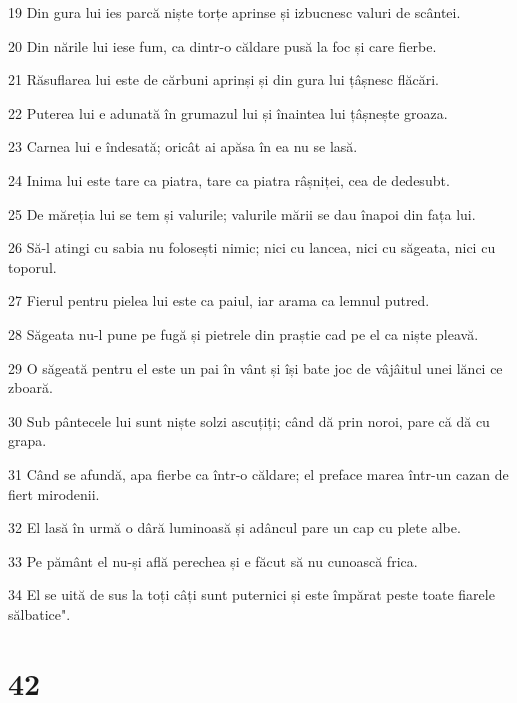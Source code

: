 \par 19 Din gura lui ies parcă niște torțe aprinse și izbucnesc valuri de scântei.
\par 20 Din nările lui iese fum, ca dintr-o căldare pusă la foc și care fierbe.
\par 21 Răsuflarea lui este de cărbuni aprinși și din gura lui țâșnesc flăcări.
\par 22 Puterea lui e adunată în grumazul lui și înaintea lui țâșnește groaza.
\par 23 Carnea lui e îndesată; oricât ai apăsa în ea nu se lasă.
\par 24 Inima lui este tare ca piatra, tare ca piatra râșniței, cea de dedesubt.
\par 25 De măreția lui se tem și valurile; valurile mării se dau înapoi din fața lui.
\par 26 Să-l atingi cu sabia nu folosești nimic; nici cu lancea, nici cu săgeata, nici cu toporul.
\par 27 Fierul pentru pielea lui este ca paiul, iar arama ca lemnul putred.
\par 28 Săgeata nu-l pune pe fugă și pietrele din praștie cad pe el ca niște pleavă.
\par 29 O săgeată pentru el este un pai în vânt și își bate joc de vâjâitul unei lănci ce zboară.
\par 30 Sub pântecele lui sunt niște solzi ascuțiți; când dă prin noroi, pare că dă cu grapa.
\par 31 Când se afundă, apa fierbe ca într-o căldare; el preface marea într-un cazan de fiert mirodenii.
\par 32 El lasă în urmă o dâră luminoasă și adâncul pare un cap cu plete albe.
\par 33 Pe pământ el nu-și află perechea și e făcut să nu cunoască frica.
\par 34 El se uită de sus la toți câți sunt puternici și este împărat peste toate fiarele sălbatice".

\chapter{42}

